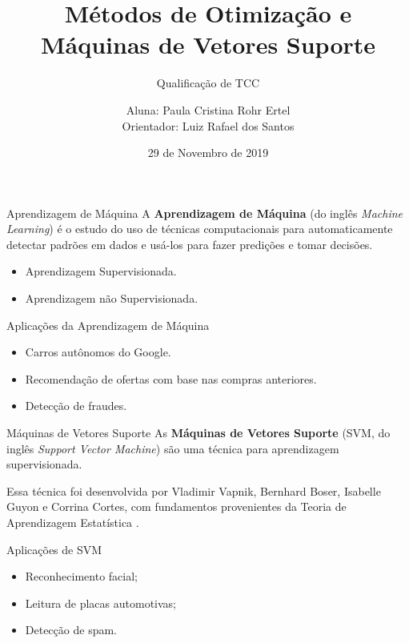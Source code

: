 \documentclass{beamer}
\title[Métodos de Otimização e SVM]{Métodos de Otimização e Máquinas de Vetores Suporte}
\subtitle{Qualificação de TCC}
\author[Paula Ertel]{Aluna: Paula Cristina Rohr Ertel \\ Orientador: Luiz Rafael dos Santos}
\institute[UFSC]{Universidade Federal de Santa Catarina - Campus Blumenau}
\date{29 de Novembro de 2019}
\theoremstyle{definition}%
\begin{document}
\begin{frame}
	\maketitle
\end{frame}


\begin{frame}{Aprendizagem de Máquina}
A \textbf{Aprendizagem de Máquina} (do inglês \textit{Machine Learning}) é o estudo do uso de técnicas computacionais para automaticamente detectar padrões em dados e usá-los para fazer predições e tomar decisões.
	\begin{itemize}
		\item Aprendizagem Supervisionada.
		\item Aprendizagem não Supervisionada.	
	\end{itemize}
\begin{block}{Aplicações da Aprendizagem de Máquina}
	\begin{itemize} %
		\item Carros autônomos do Google.
		\item Recomendação de ofertas com base nas compras anteriores.
		\item Detecção de fraudes.
	\end{itemize}
\end{block}
\end{frame}


\begin{frame}{Máquinas de Vetores Suporte}
As \textbf{Máquinas de Vetores Suporte} (SVM, do inglês \textit{Support Vector Machine}) são uma técnica para aprendizagem supervisionada.

Essa técnica foi desenvolvida por Vladimir Vapnik, Bernhard Boser, Isabelle Guyon e Corrina Cortes, com fundamentos provenientes da Teoria de Aprendizagem Estatística \cite{Evelin2017}.
\begin{block}{Aplicações de SVM}
	\begin{itemize}
	\item Reconhecimento facial; 
	\item Leitura de placas automotivas; 
	\item Detecção de spam.
	\end{itemize}
\end{block}
\end{frame}
\end{document}
